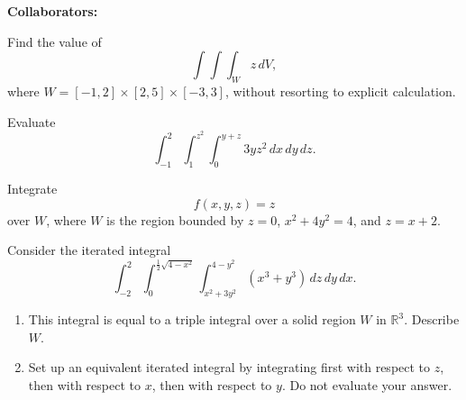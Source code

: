 \documentclass[11pt,letterpaper,boxed]{hmcpset}
\newcommand{\R}{\mathbb{R}}
\begin{document}
\noindent\textbf{Collaborators:} 


\begin{problem}[Colley 5.4 \#4]
Find the value of 
\[
	\int\int\int_W z\,dV,
\]
 where $W = [-1,2]\times[2,5]\times[-3,3]$, without resorting to explicit calculation.
\end{problem}

\begin{solution}
\vfill
\end{solution}
\newpage

\begin{problem}[Colley 5.4 \#5]
Evaluate
\[
	\int_{-1}^2\int_{1}^{z^2}\int_0^{y+z}3yz^2\,dx\,dy\,dz.
\]
\end{problem}

\begin{solution}
\vfill
\end{solution}
\newpage

\begin{problem}[Colley 5.4 \#18	]
Integrate
\[
	f(x,y,z) = z
\]
over $W$, where $W$ is the region bounded by $z=0$, $x^2+4y^2=4$, and $z=x+2$.
\end{problem}

\begin{solution}
\vfill
\end{solution}
\newpage

\begin{problem}[Colley 5.4 \#29(a),(b)]
Consider the iterated integral
\[
	\int_{-2}^2\int_0^{\frac{1}{2}\sqrt{4-x^2}}\int_{x^2+3y^2}^{4-y^2}(x^3+y^3)\,dz\,dy\,dx.
\]
\begin{enumerate}
\item This integral is equal to a triple integral over a solid region $W$ in $\R^3$. Describe $W$.
\item Set up an equivalent iterated integral by integrating first with respect to $z$, then with respect to $x$, then with
respect to $y$. Do not evaluate your answer.
\end{enumerate}
\end{problem}

\begin{solution}
\vfill
\end{solution}
\newpage
\end{document}
